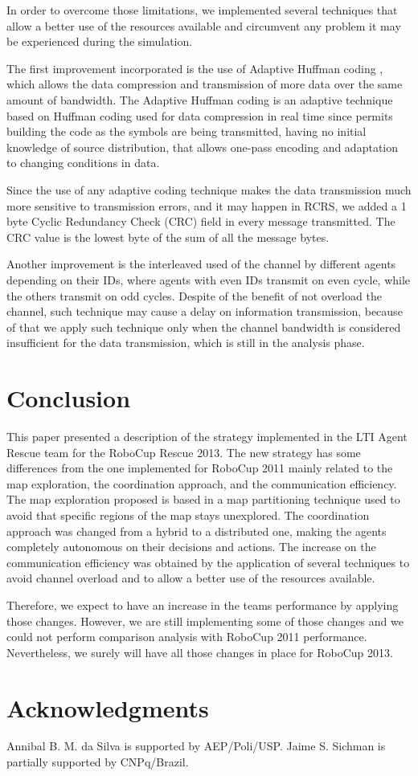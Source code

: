 \documentclass{llncs}
\begin{document}
In order to overcome those limitations, we implemented several techniques that allow a better use of the resources available and circumvent any problem it may be experienced during the simulation.

The first improvement incorporated is the use of Adaptive Huffman coding \cite{vitter1987}, which allows the data compression and transmission of more data over the same amount of bandwidth. The Adaptive Huffman coding is an adaptive technique based on Huffman coding \cite{huffman1952} used for data compression in real time since permits building the code as the symbols are being transmitted, having no initial knowledge of source distribution, that allows one-pass encoding and adaptation to changing conditions in data.

Since the use of any adaptive coding technique makes the data transmission much more sensitive to transmission errors, and it may happen in RCRS, we added a 1 byte Cyclic Redundancy Check (CRC) field in every message transmitted. The CRC value is the lowest byte of the sum of all the message bytes.

Another improvement is the interleaved used of the channel by different agents depending on their IDs, where agents with even IDs transmit on even cycle, while the others transmit on odd cycles. Despite of the benefit of not overload the channel, such technique may cause a delay on information transmission, because of that we apply such technique only when the channel bandwidth is considered insufficient for the data transmission, which is still in the analysis phase.
\section{Conclusion}
\label{sec:conclusion}
This paper presented a description of the strategy implemented in the LTI Agent Rescue team for the RoboCup Rescue 2013. The new strategy has some differences from the one implemented for RoboCup 2011 mainly related to the map exploration, the coordination approach, and the communication efficiency. The map exploration proposed is based in a map partitioning technique used to avoid that specific regions of the map stays unexplored. The coordination approach was changed from a hybrid to a distributed one, making the agents completely autonomous on their decisions and actions. The increase on the communication efficiency was obtained by the application of several techniques to avoid channel overload and to allow a better use of the resources available.

Therefore, we expect to have an increase in the teams performance by applying those changes. However, we are still implementing some of those changes and we could not perform comparison analysis with RoboCup 2011 performance. Nevertheless, we surely will have all those changes in place for RoboCup 2013.
\section*{Acknowledgments}
\label{sec:acknowledgments}
Annibal B. M. da Silva is supported by AEP/Poli/USP. Jaime S. Sichman is partially supported by CNPq/Brazil.


\end{document}
